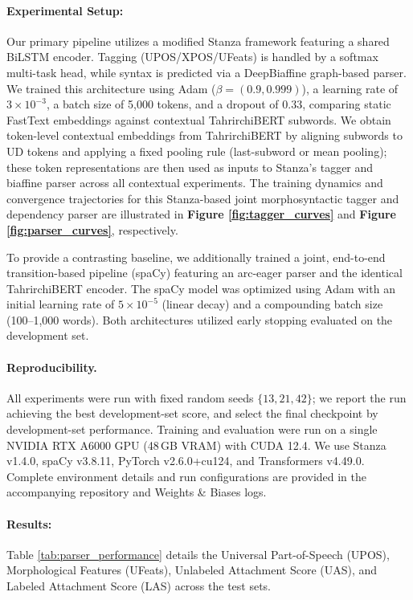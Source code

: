 \documentclass[10pt, a4paper]{article}
\begin{document}
\paragraph{Experimental Setup:}
Our primary pipeline utilizes a modified Stanza framework featuring a shared BiLSTM\cite{kiperwasser-goldberg-2016-simple} encoder. Tagging (UPOS/XPOS/UFeats) is handled by a softmax multi-task head, while syntax is predicted via a DeepBiaffine graph-based parser. We trained this architecture using Adam ($\beta=(0.9, 0.999)$), a learning rate of $3 \times 10^{-3}$, a batch size of 5,000 tokens, and a dropout of 0.33, comparing static FastText embeddings against contextual TahrirchiBERT subwords. We obtain token-level contextual embeddings from TahrirchiBERT by aligning subwords to UD tokens and applying a fixed pooling rule (last-subword or mean pooling); these token representations are then used as inputs to Stanza’s tagger and biaffine parser across all contextual experiments. The training dynamics and convergence trajectories for this Stanza-based joint morphosyntactic tagger and dependency parser are illustrated in \textbf{Figure \ref{fig:tagger_curves}} and \textbf{Figure \ref{fig:parser_curves}}, respectively.

To provide a contrasting baseline, we additionally trained a joint, end-to-end transition-based pipeline (spaCy) featuring an arc-eager parser and the identical TahrirchiBERT encoder. The spaCy model was optimized using Adam with an initial learning rate of $5 \times 10^{-5}$ (linear decay) and a compounding batch size (100--1,000 words). Both architectures utilized early stopping evaluated on the development set.
\paragraph{Reproducibility.}
All experiments were run with fixed random seeds $\{13, 21, 42\}$; we report the run achieving the best development-set score, and select the final checkpoint by development-set performance.
Training and evaluation were run on a single NVIDIA RTX A6000 GPU (48\,GB VRAM) with CUDA 12.4. We use Stanza v1.4.0, spaCy v3.8.11, PyTorch v2.6.0+cu124, and Transformers v4.49.0. Complete environment details and run configurations are provided in the accompanying repository and Weights \& Biases logs.
\paragraph{Results:}
Table \ref{tab:parser_performance} details the Universal Part-of-Speech (UPOS), Morphological Features (UFeats), Unlabeled Attachment Score (UAS), and Labeled Attachment Score (LAS) across the test sets.
\end{document}
